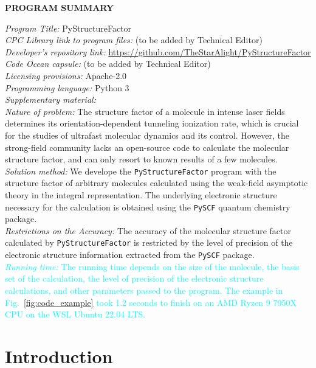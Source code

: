 \documentclass[preprint,12pt]{elsarticle} %
\newcommand{\cyan}[1]{\textcolor{cyan}{#1}}     %
\begin{document}
{\bf \noindent PROGRAM SUMMARY} \\
\begin{small}
\noindent
{\em Program Title:} PyStructureFactor \\
{\em CPC Library link to program files:} (to be added by Technical Editor) \\
{\em Developer's repository link:} \url{https://github.com/TheStarAlight/PyStructureFactor} \\
{\em Code Ocean capsule:} (to be added by Technical Editor) \\
{\em Licensing provisions:} Apache-2.0 \\
{\em Programming language:} Python 3                                  \\
{\em Supplementary material:}                                 \\
{\em Nature of problem:} The structure factor of a molecule in intense laser fields determines its orientation-dependent tunneling ionization rate, which is crucial for the studies of ultrafast molecular dynamics and its control. However, the strong-field community lacks an open-source code to calculate the molecular structure factor, and can only resort to known results of a few molecules. \\
{\em Solution method:} We develope the \texttt{PyStructureFactor} program with the structure factor of arbitrary molecules calculated using the weak-field asymptotic theory in the integral representation. The underlying electronic structure necessary for the calculation is obtained using the \texttt{PySCF} quantum chemistry package. \\
{\em Restrictions on the Accuracy:} The accuracy of the molecular structure factor calculated by \texttt{PyStructureFactor} is restricted by the level of precision of the electronic structure information extracted from the \texttt{PySCF} package. \\
\cyan{{\em Running time:} The running time depends on the size of the molecule, the basis set of the calculation, the level of precision of the electronic structure calculations, and other parameters passed to the program. The example in Fig.~\ref{fig:code_example} took 1.2 seconds to finish on an AMD Ryzen 9 7950X CPU on the WSL Ubuntu 22.04 LTS.}
\end{small}


\section{Introduction}
\label{sec:intro}
\end{document}
